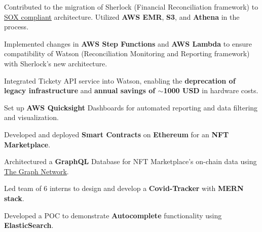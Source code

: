 \documentclass[]{deedy-resume-openfont}
\begin{document}
\begin{tightemize}

\item Contributed to the migration of Sherlock (Financial Reconciliation framework) to \href{https://en.wikipedia.org/wiki/Sarbanes\%E2\%80\%93Oxley\_Act}{\underline{SOX compliant}} architecture. Utilized \textbf{AWS EMR}, \textbf{S3}, and \textbf{Athena} in the process.

\item Implemented changes in \textbf{AWS Step Functions} and \textbf{AWS Lambda} to ensure compatibility of Watson (Reconciliation Monitoring and Reporting framework) with Sherlock's new architecture.

\item Integrated Tickety API service into Watson, enabling the \textbf{deprecation of legacy infrastructure} and \textbf{annual savings of \(\sim \)1000 USD} in hardware costs.

\item Set up \textbf{AWS Quicksight} Dashboards for automated reporting and data filtering and visualization.

\end{tightemize}
\sectionsep

\begin{tightemize}

\item Developed and deployed \textbf{Smart Contracts} on \textbf{Ethereum} for an \textbf{NFT Marketplace}.

\item Architectured a \textbf{GraphQL} Database for NFT Marketplace's on-chain data using \href{https://thegraph.com/docs/en/network/overview/}{\underline{The Graph Network}}.

\end{tightemize}
\sectionsep

\begin{tightemize}
\item Led team of 6 interns to design and develop a {\bf Covid-Tracker} with {\bf MERN stack}.
\item Developed a POC to demonstrate {\bf Autocomplete} functionality using {\bf ElasticSearch}.
\end{tightemize}
\sectionsep
\end{document}
